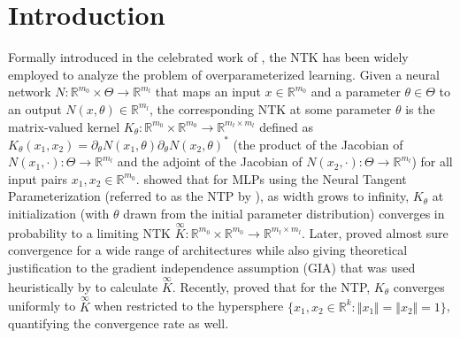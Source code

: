 \documentclass[twoside,11pt]{article}
\newcommand{\R}{\mathbb{R}}
\newcommand{\limiting}[1]{\overset{\scriptscriptstyle\infty}{#1}}
\begin{document}



\section{Introduction} \label{introduction}
Formally introduced in the celebrated work of \citet{Jacotetal2018}, the NTK has been widely employed to analyze the problem of overparameterized learning. Given a neural network $N : \R^{m_0} \times \Theta \to \R^{m_l}$ that maps an input $x \in \R^{m_0}$ and a parameter $\theta \in \Theta$ to an output $N(x,\theta) \in \R^{m_l}$, the corresponding NTK at some parameter $\theta$ is the matrix-valued kernel $K_\theta : \R^{m_0} \times \R^{m_0} \to \R^{m_l \times m_l}$ defined as $K_\theta(x_1,x_2) = \partial_\theta N(x_1,\theta) {\partial_\theta N(x_2,\theta)}^*$ (the product of the Jacobian of $N(x_1,\cdot) : \Theta \to \R^{m_l}$ and the adjoint of the Jacobian of $N(x_2,\cdot) : \Theta \to \R^{m_l}$) for all input pairs $x_1,x_2 \in \R^{m_0}$. \citet{Jacotetal2018} showed that for MLPs using the Neural Tangent Parameterization (referred to as the NTP by \citet{Yangetal2021}), as width grows to infinity, $K_\theta$ at initialization (with $\theta$ drawn from the initial parameter distribution) converges in probability to a limiting NTK $\limiting{K}: \R^{m_0} \times \R^{m_0} \to \R^{m_l \times m_l}$. Later, \citet{Yang2020} proved almost sure convergence for a wide range of architectures while also giving theoretical justification to the gradient independence assumption (GIA) that was used heuristically by \citet{Jacotetal2018} to calculate $\limiting{K}$. Recently, \citet{Xuetal2024} proved that for the NTP, $K_\theta$ converges uniformly to $\limiting{K}$ when restricted to the hypersphere $\{ x_1, x_2 \in \R^k : \Vert x_1 \Vert = \Vert x_2 \Vert = 1 \}$, quantifying the convergence rate as well.
\end{document}
